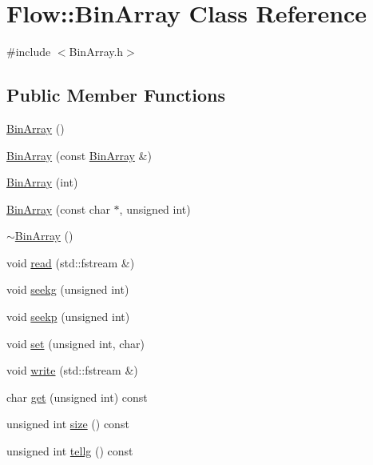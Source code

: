 \hypertarget{class_flow_1_1_bin_array}{}\section{Flow\+:\+:Bin\+Array Class Reference}
\label{class_flow_1_1_bin_array}


{\ttfamily \#include $<$Bin\+Array.\+h$>$}

\subsection*{Public Member Functions}
\begin{DoxyCompactItemize}
\item 
\hyperlink{class_flow_1_1_bin_array_a7a0c55743a9f13a879fadf436975c783}{Bin\+Array} ()
\item 
\hyperlink{class_flow_1_1_bin_array_a724678cc512fa1af237828f00ae399b9}{Bin\+Array} (const \hyperlink{class_flow_1_1_bin_array}{Bin\+Array} \&)
\item 
\hyperlink{class_flow_1_1_bin_array_a9be6e4200112d2be0acda60bc3e00e54}{Bin\+Array} (int)
\item 
\hyperlink{class_flow_1_1_bin_array_a00ae7fecb962afef80f01f69b02c31e4}{Bin\+Array} (const char $\ast$, unsigned int)
\item 
\hyperlink{class_flow_1_1_bin_array_afaf8118b48d7d9805369942397bf8ed1}{$\sim$\+Bin\+Array} ()
\item 
void \hyperlink{class_flow_1_1_bin_array_aa27012674a47706286b91b827599df43}{read} (std\+::fstream \&)
\item 
void \hyperlink{class_flow_1_1_bin_array_a81034d4e23c65e830ac7126e2a715097}{seekg} (unsigned int)
\item 
void \hyperlink{class_flow_1_1_bin_array_a5d04d9154c3c9d7e48bdac55d9492072}{seekp} (unsigned int)
\item 
void \hyperlink{class_flow_1_1_bin_array_abace37ef0e954eec574b19a1f2560991}{set} (unsigned int, char)
\item 
void \hyperlink{class_flow_1_1_bin_array_a287fe19d7806d46445e7454fbf384317}{write} (std\+::fstream \&)
\item 
char \hyperlink{class_flow_1_1_bin_array_ae8b13ba75aee1860d94fbd3e4309453b}{get} (unsigned int) const
\item 
unsigned int \hyperlink{class_flow_1_1_bin_array_af0431a608e20947b0401d90aebd7c5ef}{size} () const
\item 
unsigned int \hyperlink{class_flow_1_1_bin_array_ab1a912bdb067a3eaae6d6a3081aa4951}{tellg} () const

\end{DoxyCompactItemize}
